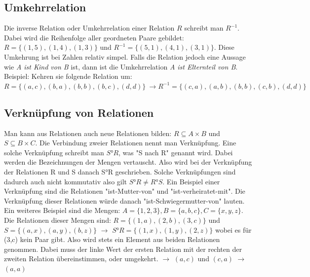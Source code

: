 \documentclass{article}
\begin{document}
	 \subsection{Umkehrrelation}
	 Die inverse Relation oder Umkehrrelation einer Relation $R$ schreibt man $R^{-1}$. Dabei wird die Reihenfolge aller geordneten Paare gebildet: $R=\{(1,5),(1,4),(1,3)\}$ und $R^{-1}=\{(5,1),(4,1),(3,1)\}$. Diese Umkehrung ist bei Zahlen relativ simpel. Falls die Relation jedoch eine Aussage wie \textit{A ist Kind von B} ist, dann ist die Umkehrrelation \textit{A ist Elternteil von B}. \\
	 Beispiel: Kehren sie folgende Relation um:
	 $R=\{(a,c),(b,a),(b,b),(b,c),(d,d)\}\ \to R^{-1} = \{(c,a),(a,b),(b,b),(c,b),(d,d)\}$ \\
	 \subsection{Verknüpfung von Relationen}
	 Man kann aus Relationen auch neue Relationen bilden: $R\subseteq A\times B$ und $S\subseteq B\times C$. Die Verbindung zweier Relationen nennt man Verknüpfung. Eine solche Verknüpfung schreibt man $S°R$, was "S nach R" genannt wird. Dabei werden die Bezeichnungen der Mengen vertauscht. Also wird bei der Verknüpfung der Relationen R und S danach S°R geschrieben. Solche Verknüpfungen sind dadurch auch nicht kommutativ also gilt $S°R \neq R°S$. Ein Beispiel einer Verknüpfung sind die Relationen "ist-Mutter-von" und "ist-verheiratet-mit". Die Verknüpfung dieser Relationen würde danach "ist-Schwiegermutter-von" lauten. \\
	 Ein weiteres Beispiel sind die Mengen: $A=\{1,2,3\}, B=\{a,b,c\}, C=\{x,y,z\}$. Die Relationen dieser Mengen sind: $R=\{(1,a),(2,b),(3,c)\}$ und $S=\{(a,x),(a,y),(b,z)\}$ $\to$ $S°R=\{(1,x),(1,y),(2,z)\}$ wobei es für (3,c) kein Paar gibt. Also wird stets ein Element aus beiden Relationen genommen. Dabei muss der linke Wert der ersten Relation mit der rechten der zweiten Relation übereinstimmen, oder umgekehrt. $\to$ $(a,c)$ und $(c,a)$ $\to$ $(a,a)$ 
\end{document}
